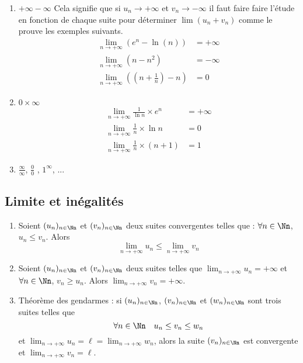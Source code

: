 \documentclass[class=report,crop=false]{standalone}
\begin{document}
\begin{exemple}
\sauteligne
  \begin{enumerate}
    \item \og $+\infty-\infty$ \fg{} Cela signifie que si $u_n \to + \infty$ et $v_n \to - \infty$
    il faut faire faire l'étude en fonction de chaque suite pour déterminer $\lim (u_n+v_n)$ comme le prouve les exemples suivants.
      \begin{align*}
        \lim_{n\to +\infty}\left(e^n-\ln(n)\right)&=+\infty\\
                                \lim_{n\to +\infty}\left(n-n^2\right)&=-\infty \\
                                \lim_{n\to +\infty}\left(\left(n+\frac{1}{n}\right)-n\right)&=0
      \end{align*}
    \item \og $0\times \infty$ \fg{}
             \begin{align*}
               \lim_{n\to +\infty} \frac{1}{\ln n} \times e^n &=+\infty\\
                                \lim_{n\to +\infty} \frac{1}{n} \times \ln n
                                &=0 \\
                                \lim_{n\to +\infty} \frac{1}{n} \times (n+1)
                                &=1
                        \end{align*}
    \item \og $\frac{\infty}{\infty}$\fg{}, \og $\frac{0}{0}$ \fg{}, \og $1^\infty$\fg{}, ...
  \end{enumerate}
\end{exemple}


\subsection{Limite et inégalités}

\begin{proposition}
\label{prop:lim_ineg}
\sauteligne
  \begin{enumerate}
    \item Soient $(u_n)_{n\in \Nn}$ et $(v_n)_{n\in \Nn}$ deux suites convergentes
telles que : $\forall n \in \Nn$, $u_n\leq v_n$. Alors
      \[\lim_{n\to +\infty} u_n \leq \lim_{n\to +\infty} v_n\]
    \item  Soient $(u_n)_{n\in \Nn}$ et $(v_n)_{n\in \Nn}$ deux suites telles que
$\lim_{n\to +\infty} u_n=+\infty$ et  $\forall n \in \Nn$, $v_n \geq u_n$.
Alors $\lim_{n\to +\infty} v_n=+\infty$.
    \item Théorème des  \og gendarmes \fg{} : si $(u_n)_{n\in \Nn}$,
$(v_n)_{n\in \Nn}$ et $(w_n)_{n\in \Nn}$ sont trois suites telles que
      \[ \forall n \in \Nn \quad u_n\leq v_n\leq w_n \]
et $\lim_{n\to +\infty}u_n=\ell=\lim_{n\to +\infty}w_n$, alors la suite $(v_n)_{n\in \Nn}$
est convergente et $\lim_{n\to +\infty} v_n=\ell$.
  \end{enumerate}
\end{proposition}
\end{document}
